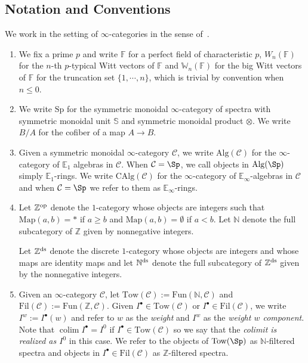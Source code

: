 \documentclass[english,10pt]{amsart}
\newcommand{\field}{\mathbb{F}}
\theoremstyle{definition}
\numberwithin{equation}{section}
\DeclareMathOperator*{\colim}{colim}
\newcommand{\cC}{\mathcal{C}}
\newcommand{\z}{\mathbb{Z}}
\begin{document}
\subsection{Notation and Conventions}\label{not-conv} We work in the setting of $\infty$-categories in the sense of~\cite{lurie2016higher}. 
\begin{enumerate}
\item We fix a prime $p$ and write $\field$ for a perfect field of characteristic $p$, $W_n(\field)$ for the $n$-th $p$-typical Witt vectors of $\field$ and $\mathbb{W}_n(\field)$ for the big Witt vectors of $\field$ for the truncation set $\{1,\cdots ,n\}$, which is trivial by convention when $n\le 0$.  
\item We write $\mathrm{Sp}$ for the symmetric monoidal $\infty$-category of spectra with symmetric monoidal unit $\mathbb{S}$ and symmetric monoidal product $\otimes$. We write $B/A$ for the cofiber of a map $A\to B$.
\item Given a symmetric monoidal $\infty$-category $\cC$, we write $\mathrm{Alg}(\cC)$ for the $\infty$-category of $\mathbb{E}_1$ algebras in $\cC$. When $\cC=\Sp$, we call objects in $\mathrm{Alg}(\Sp)$ simply $\mathbb{E}_1$-rings. We write $\mathrm{CAlg}(\cC)$ for the $\infty$-category of $\mathbb{E}_{\infty}$-algebras in $\mathcal{C}$ and when $\mathcal{C}=\Sp$ we refer to them as $\mathbb{E}_\infty$-rings. 
\item Let $\mathbb{Z}^{\textup{op}}$ denote the $1$-category whose objects are integers such that $\mathrm{Map}(a,b)=*$ if $a\ge b$ and $\mathrm{Map}(a,b)=\emptyset$ if $a<b$. Let  $\mathbb{N}$ denote the full subcategory of $\z$ given by nonnegative integers.

 Let $\mathbb{Z}^{\textup{ds}}$ denote the discrete $1$-category whose objects are integers and whose maps are identity maps and let $\mathbb{N}^{\textup{ds}}$ denote the full subcategory of $\z^{\textup{ds}}$ given by the nonnegative integers.

\item Given an $\infty$-category $\cC$, let $\mathrm{Tow}(\cC):=\mathrm{Fun}(\mathbb{N},\cC)$ and $\mathrm{Fil}(\cC):=\mathrm{Fun}(\mathbb{Z},\cC)$. 
Given $I^{\bullet}\in\mathrm{Tow}(\cC)$ or $I^{\bullet}\in\mathrm{Fil}(\cC)$, we write $I^w:=I^{\bullet}(w)$ and refer to $w$ as the \emph{weight} and $I^w$ as the \emph{weight $w$ component}. Note that $\colim I^\bullet=I^0$ if $I^{\bullet}\in \mathrm{Tow}(\mathcal{C})$ so we say that the \emph{colimit is realized as $I^0$} in this case. 
We refer to the objects of $\mathrm{Tow}(\Sp)$ as $\mathbb{N}$-filtered spectra and objects in $I^{\bullet}\in\mathrm{Fil}(\cC)$ as $\mathbb{Z}$-filtered spectra. 


\end{enumerate}
\end{document}
